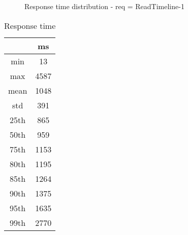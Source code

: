 \begin{minipage}{0.75\linewidth}
\begin{figure}[h]
\begin{adjustbox}{max width=1.0\linewidth, keepaspectratio}
  \end{adjustbox}
  \caption{Response time distribution - req = ReadTimeline-1}
\end{figure}
\end{minipage}\hfill\begin{minipage}{0.18\linewidth}
\begin{table}[h]
\begin{tabular}{|cc|}
\hline
\textbf{} & \textbf{ms}\\ \hline
 \Xhline{0.005\arrayrulewidth}
min & 13\\
 \Xhline{0.005\arrayrulewidth}
max & 4587\\
 \Xhline{0.005\arrayrulewidth}
mean & 1048\\
 \Xhline{0.005\arrayrulewidth}
std & 391\\
\hline
\hline
 \Xhline{0.005\arrayrulewidth}
25th & 865\\
 \Xhline{0.005\arrayrulewidth}
50th & 959\\
 \Xhline{0.005\arrayrulewidth}
75th & 1153\\
 \Xhline{0.005\arrayrulewidth}
80th & 1195\\
 \Xhline{0.005\arrayrulewidth}
85th & 1264\\
 \Xhline{0.005\arrayrulewidth}
90th & 1375\\
 \Xhline{0.005\arrayrulewidth}
95th & 1635\\
 \Xhline{0.005\arrayrulewidth}
99th & 2770\\
\hline
\end{tabular}
\caption{Response time}
\end{table}
\end{minipage}\hfill